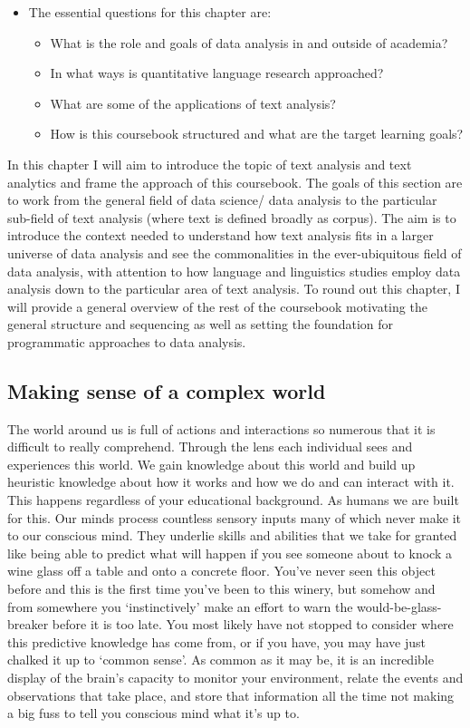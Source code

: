 \documentclass[
]{article}
\providecommand{\tightlist}{%
  \setlength{\itemsep}{0pt}\setlength{\parskip}{0pt}}
\newenvironment{rmdblock}[1]
  {\begin{shaded*}
  \begin{itemize}
  \renewcommand{\labelitemi}{
    \raisebox{-.5\height}[0pt][0pt]{
      {\setkeys{Gin}{width=2em,keepaspectratio}\texttt{[image: assets/images/\#1]}}
    }
  }
  \item
  }
  {
  \end{itemize}
  \end{shaded*}
  }
\newenvironment{rmdkey}
  {\begin{rmdblock}{key}}
  {\end{rmdblock}}
\begin{document}
\begin{rmdkey}
The essential questions for this chapter are:

\begin{itemize}
\tightlist
\item
  What is the role and goals of data analysis in and outside of
  academia?
\item
  In what ways is quantitative language research approached?
\item
  What are some of the applications of text analysis?
\item
  How is this coursebook structured and what are the target learning
  goals?
\end{itemize}
\end{rmdkey}

In this chapter I will aim to introduce the topic of text analysis and text analytics and frame the approach of this coursebook. The goals of this section are to work from the general field of data science/ data analysis to the particular sub-field of text analysis (where text is defined broadly as corpus). The aim is to introduce the context needed to understand how text analysis fits in a larger universe of data analysis and see the commonalities in the ever-ubiquitous field of data analysis, with attention to how language and linguistics studies employ data analysis down to the particular area of text analysis. To round out this chapter, I will provide a general overview of the rest of the coursebook motivating the general structure and sequencing as well as setting the foundation for programmatic approaches to data analysis.

\hypertarget{making-sense-of-a-complex-world}{%
\subsection{Making sense of a complex world}\label{making-sense-of-a-complex-world}}

The world around us is full of actions and interactions so numerous that it is difficult to really comprehend. Through the lens each individual sees and experiences this world. We gain knowledge about this world and build up heuristic knowledge about how it works and how we do and can interact with it. This happens regardless of your educational background. As humans we are built for this. Our minds process countless sensory inputs many of which never make it to our conscious mind. They underlie skills and abilities that we take for granted like being able to predict what will happen if you see someone about to knock a wine glass off a table and onto a concrete floor. You've never seen this object before and this is the first time you've been to this winery, but somehow and from somewhere you `instinctively' make an effort to warn the would-be-glass-breaker before it is too late. You most likely have not stopped to consider where this predictive knowledge has come from, or if you have, you may have just chalked it up to `common sense'. As common as it may be, it is an incredible display of the brain's capacity to monitor your environment, relate the events and observations that take place, and store that information all the time not making a big fuss to tell you conscious mind what it's up to.
\end{document}
